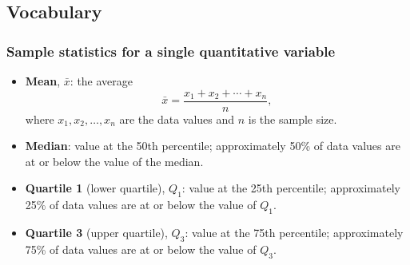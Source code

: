 \documentclass[
]{report}
\providecommand{\tightlist}{%
  \setlength{\itemsep}{0pt}\setlength{\parskip}{0pt}}
\begin{document}
\subsection{Vocabulary}\label{vocabulary-4}

\subsubsection*{Sample statistics for a single quantitative variable}\label{sample-statistics-for-a-single-quantitative-variable}

\begin{itemize}
\item
  \textbf{Mean}, \(\bar{x}\): the average
  \[ 
  \bar{x} = \frac{x_1 + x_2 + \cdots + x_n}{n},
  \]
  where \(x_1, x_2, \ldots, x_n\) are the data values and \(n\) is the sample size.
\item
  \textbf{Median}: value at the 50th percentile; approximately 50\% of data values are at or below the value of the median.
\end{itemize}

\vspace{1mm}

\begin{itemize}
\tightlist
\item
  \textbf{Quartile 1} (lower quartile), \(Q_1\): value at the 25th percentile; approximately 25\% of data values are at or below the value of \(Q_1\).
\end{itemize}

\vspace{1mm}

\begin{itemize}
\tightlist
\item
  \textbf{Quartile 3} (upper quartile), \(Q_3\): value at the 75th percentile; approximately 75\% of data values are at or below the value of \(Q_3\).
\end{itemize}

\newpage
\end{document}
